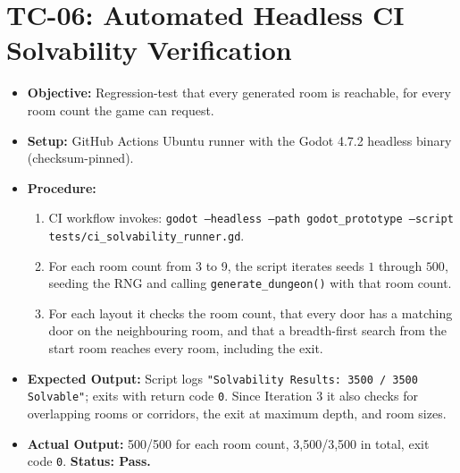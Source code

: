 \section{TC-06: Automated Headless CI Solvability Verification}
\begin{itemize}
    \item \textbf{Objective:} Regression-test that every generated room is reachable, for every room count the game can request.
    \item \textbf{Setup:} GitHub Actions Ubuntu runner with the Godot 4.7.2 headless binary (checksum-pinned).
    \item \textbf{Procedure:}
    \begin{enumerate}
        \item CI workflow invokes: \texttt{godot --headless --path godot\_prototype --script tests/ci\_solvability\_runner.gd}.
        \item For each room count from 3 to 9, the script iterates seeds $1$ through $500$, seeding the RNG and calling \texttt{generate\_dungeon()} with that room count.
        \item For each layout it checks the room count, that every door has a matching door on the neighbouring room, and that a breadth-first search from the start room reaches every room, including the exit.
    \end{enumerate}
    \item \textbf{Expected Output:} Script logs \texttt{"Solvability Results: 3500 / 3500 Solvable"}; exits with return code \texttt{0}. Since Iteration 3 it also checks for overlapping rooms or corridors, the exit at maximum depth, and room sizes.
    \item \textbf{Actual Output:} 500/500 for each room count, 3,500/3,500 in total, exit code \texttt{0}. \textbf{Status: Pass.}
\end{itemize}

